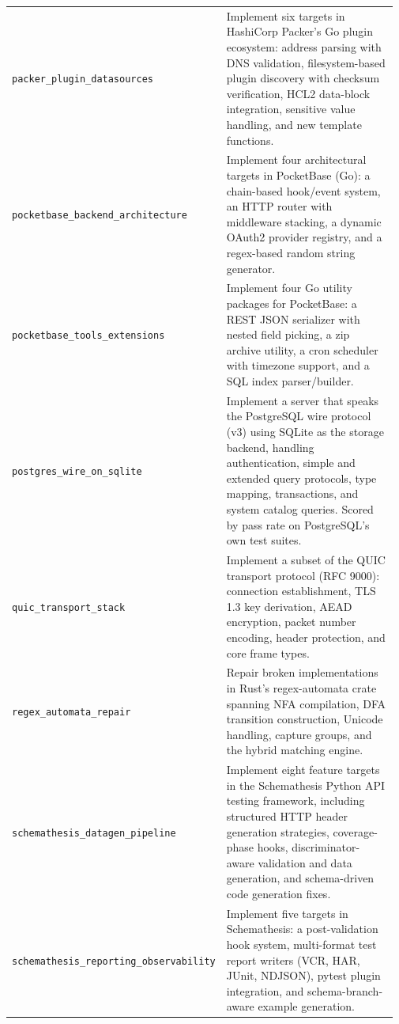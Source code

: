 \begin{longtable}{@{}>{\raggedright\arraybackslash}p{0.20\linewidth}>{\raggedright\arraybackslash}p{0.77\linewidth}@{}}
\tasknoterule
\texttt{packer\_\allowbreak{}plugin\_\allowbreak{}datasources} & Implement six targets in HashiCorp Packer's Go plugin ecosystem: address parsing with DNS validation, filesystem-based plugin discovery with checksum verification, HCL2 data-block integration, sensitive value handling, and new template functions. \\
\tasknoterule
\texttt{pocketbase\_\allowbreak{}backend\_\allowbreak{}architecture} & Implement four architectural targets in PocketBase (Go): a chain-based hook/event system, an HTTP router with middleware stacking, a dynamic OAuth2 provider registry, and a regex-based random string generator. \\
\tasknoterule
\texttt{pocketbase\_\allowbreak{}tools\_\allowbreak{}extensions} & Implement four Go utility packages for PocketBase: a REST JSON serializer with nested field picking, a zip archive utility, a cron scheduler with timezone support, and a SQL index parser/builder. \\
\tasknoterule
\texttt{postgres\_\allowbreak{}wire\_\allowbreak{}on\_\allowbreak{}sqlite} & Implement a server that speaks the PostgreSQL wire protocol (v3) using SQLite as the storage backend, handling authentication, simple and extended query protocols, type mapping, transactions, and system catalog queries. Scored by pass rate on PostgreSQL's own test suites. \\
\tasknoterule
\texttt{quic\_\allowbreak{}transport\_\allowbreak{}stack} & Implement a subset of the QUIC transport protocol (RFC 9000): connection establishment, TLS 1.3 key derivation, AEAD encryption, packet number encoding, header protection, and core frame types. \\
\tasknoterule
\texttt{regex\_\allowbreak{}automata\_\allowbreak{}repair} & Repair broken implementations in Rust's regex-automata crate spanning NFA compilation, DFA transition construction, Unicode handling, capture groups, and the hybrid matching engine. \\
\tasknoterule
\texttt{schemathesis\_\allowbreak{}datagen\_\allowbreak{}pipeline} & Implement eight feature targets in the Schemathesis Python API testing framework, including structured HTTP header generation strategies, coverage-phase hooks, discriminator-aware validation and data generation, and schema-driven code generation fixes. \\
\tasknoterule
\texttt{schemathesis\_\allowbreak{}reporting\_\allowbreak{}observability} & Implement five targets in Schemathesis: a post-validation hook system, multi-format test report writers (VCR, HAR, JUnit, NDJSON), pytest plugin integration, and schema-branch-aware example generation. \\

\end{longtable}
